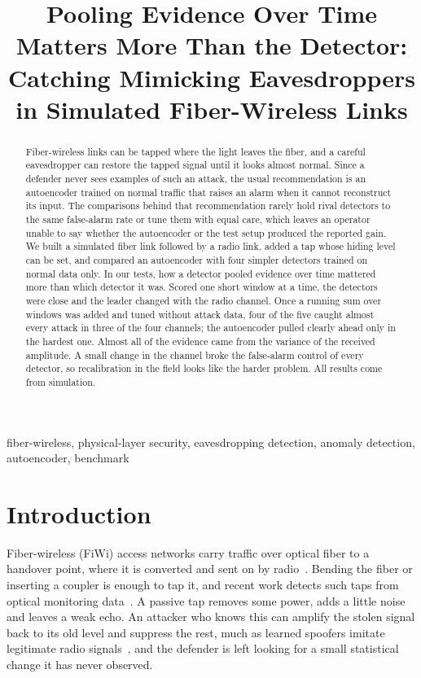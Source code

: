 \documentclass[conference]{IEEEtran}
\title{Pooling Evidence Over Time Matters More Than the Detector: Catching Mimicking Eavesdroppers in Simulated Fiber-Wireless Links}
\author{\IEEEauthorblockN{Anonymous Authors}
\IEEEauthorblockA{Anonymous Affiliation\\
Anonymous City, Country}}
\begin{document}
\maketitle
\thispagestyle{firstpage}

\begin{abstract}
Fiber-wireless links can be tapped where the light leaves the fiber, and a careful eavesdropper can restore the tapped signal until it looks almost normal. Since a defender never sees examples of such an attack, the usual recommendation is an autoencoder trained on normal traffic that raises an alarm when it cannot reconstruct its input. The comparisons behind that recommendation rarely hold rival detectors to the same false-alarm rate or tune them with equal care, which leaves an operator unable to say whether the autoencoder or the test setup produced the reported gain. We built a simulated fiber link followed by a radio link, added a tap whose hiding level can be set, and compared an autoencoder with four simpler detectors trained on normal data only. In our tests, how a detector pooled evidence over time mattered more than which detector it was. Scored one short window at a time, the detectors were close and the leader changed with the radio channel. Once a running sum over windows was added and tuned without attack data, four of the five caught almost every attack in three of the four channels; the autoencoder pulled clearly ahead only in the hardest one. Almost all of the evidence came from the variance of the received amplitude. A small change in the channel broke the false-alarm control of every detector, so recalibration in the field looks like the harder problem. All results come from simulation.
\end{abstract}

\begin{IEEEkeywords}
fiber-wireless, physical-layer security, eavesdropping detection, anomaly detection, autoencoder, benchmark
\end{IEEEkeywords}

\section{Introduction}
Fiber-wireless (FiWi) access networks carry traffic over optical fiber to a handover point, where it is converted and sent on by radio~\cite{tsompanoglou2023}. Bending the fiber or inserting a coupler is enough to tap it, and recent work detects such taps from optical monitoring data~\cite{li2025fiber,qin2026localization,knapinska2025}. A passive tap removes some power, adds a little noise and leaves a weak echo. An attacker who knows this can amplify the stolen signal back to its old level and suppress the rest, much as learned spoofers imitate legitimate radio signals~\cite{shi2021gan}, and the defender is left looking for a small statistical change it has never observed.
\end{document}
